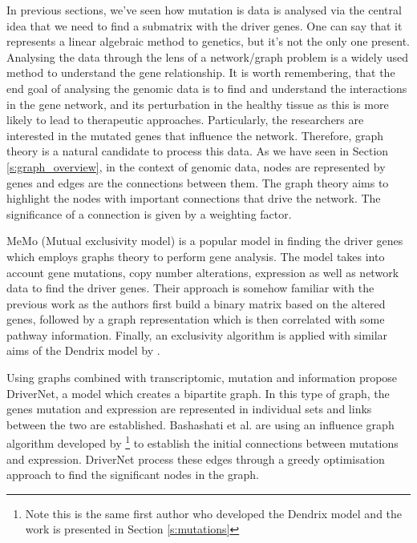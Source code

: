 In previous sections, we've seen how mutation is data is analysed via the central idea that we need to find a submatrix with the driver genes. One can say that it represents a linear algebraic method to genetics, but it's not the only one present. Analysing the data through the lens of a network/graph problem is a widely used method to understand the gene relationship. It is worth remembering, that the end goal of analysing the genomic data is to find and understand the interactions in the gene network, and its perturbation in the healthy tissue as this is more likely to lead to therapeutic approaches. Particularly, the researchers are interested in the mutated genes that influence the network. Therefore, graph theory is a natural candidate to process this data. As we have seen in Section \ref{s:graph_overview}, in the context of genomic data, nodes are represented by genes and edges are the connections between them. The graph theory aims to highlight the nodes with important connections that drive the network. The significance of a connection is given by a weighting factor.

MeMo (Mutual exclusivity model)\cite{Ciriello2012-hi} is a popular model in finding the driver genes which employs graphs theory to perform gene analysis. The model takes into account gene mutations, copy number alterations, expression as well as network data to find the driver genes. Their approach is somehow familiar with the previous work as the authors first build a binary matrix based on the altered genes, followed by a graph representation which is then correlated with some pathway information. Finally, an exclusivity algorithm is applied with similar aims of the Dendrix model by \citet{Vandin2012-cf}.

Using graphs combined with transcriptomic, mutation and information \citet{Bashashati2012-lk} propose DriverNet, a model which creates a bipartite graph. In this type of graph, the genes mutation and expression are represented in individual sets and links between the two are established. Bashashati et al. are using an influence graph algorithm developed by \citet{Vandin2011-bs}\footnote{Note this is the same first author who developed the Dendrix model and the work is presented in Section \ref{s:mutations}} to establish the initial connections between mutations and expression. DriverNet process these edges through a greedy optimisation approach to find the significant nodes in the graph. 

